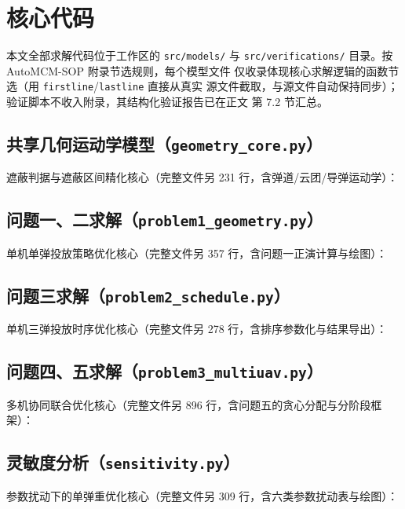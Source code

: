 \documentclass[12pt, a4paper]{article}
\begin{document}
\appendix
\section{核心代码}

本文全部求解代码位于工作区的 \texttt{src/models/} 与 \texttt{src/verifications/}
目录。按 AutoMCM-SOP 附录节选规则，每个模型文件
仅收录体现核心求解逻辑的函数节选（用 \texttt{firstline}/\texttt{lastline} 直接从真实
源文件截取，与源文件自动保持同步）；验证脚本不收入附录，其结构化验证报告已在正文
第 7.2 节汇总。

\subsection{共享几何运动学模型（\texttt{geometry\_core.py}）}

遮蔽判据与遮蔽区间精化核心（完整文件另 231 行，含弹道/云团/导弹运动学）：


\subsection{问题一、二求解（\texttt{problem1\_geometry.py}）}

单机单弹投放策略优化核心（完整文件另 357 行，含问题一正演计算与绘图）：


\subsection{问题三求解（\texttt{problem2\_schedule.py}）}

单机三弹投放时序优化核心（完整文件另 278 行，含排序参数化与结果导出）：


\subsection{问题四、五求解（\texttt{problem3\_multiuav.py}）}

多机协同联合优化核心（完整文件另 896 行，含问题五的贪心分配与分阶段框架）：


\subsection{灵敏度分析（\texttt{sensitivity.py}）}

参数扰动下的单弹重优化核心（完整文件另 309 行，含六类参数扰动表与绘图）：

\end{document}

